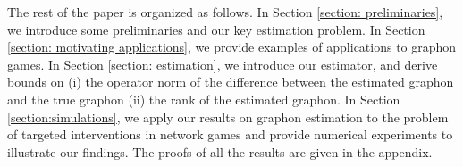 \documentclass[11pt]{article}
\newcommand{\blue}[1]{\textcolor{blue}{#1}}
\newcommand{\<}{\langle}
\renewcommand{\>}{\rangle}
\theoremstyle{plain}
\theoremstyle{definition}
\theoremstyle{remark}
\begin{document}

 

The rest of the paper is organized as follows. In Section \ref{section: preliminaries}, we introduce some preliminaries and our key estimation problem. In Section \ref{section: motivating applications}, we provide examples of  applications to graphon games. 
 In Section \ref{section: estimation}, we introduce our estimator, and derive bounds on (i) the operator norm of the difference between the estimated graphon and the true graphon (ii) the rank of the estimated graphon. In Section \ref{section:simulations}, we apply our results on graphon estimation to the problem of targeted interventions in network games and provide numerical experiments to illustrate our findings. The proofs of all the results are given in the appendix. 
\end{document}

